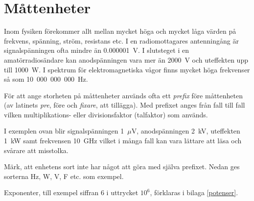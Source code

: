 \chapter{Måttenheter}

  Inom fysiken förekommer allt mellan mycket höga och mycket låga
  värden på frekvens, spänning, ström, resistans etc.
  I en radiomottagares antenningång är signalspänningen ofta mindre än
  0.000001~V.
  I slutsteget i en amatörradiosändare kan anodspänningen vara mer än 2000~V och
  uteffekten upp till 1000~W.
  I spektrum för elektromagnetiska vågor finns mycket höga frekvenser så som 10~000~000~000~Hz.

  För att ange storheten på måttenheter används ofta ett \emph{prefix} före
  måttenheten (av latinets \emph{pre}, före och \emph{fixare}, att tillägga).
  Med prefixet anges från fall till fall vilken multiplikations- eller
  divisionsfaktor (talfaktor) som används.

  I exemplen ovan blir signalspänningen 1~\(\mu\)V, anodspänningen 2~kV,
  uteffekten 1~kW samt frekvensen 10~GHz vilket i många fall kan vara lättare
  att läsa och svårare att misstolka.
 
  Märk, att enhetens sort inte har något att göra med själva prefixet.
  Nedan ges sorterna Hz, W, V, F etc. som exempel.

  Exponenter, till exempel siffran 6 i uttrycket \(10^6\), förklaras i
  bilaga \ref{potenser}.

